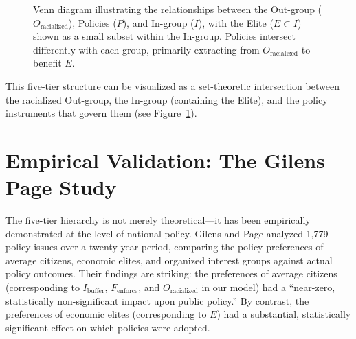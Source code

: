 \documentclass[12pt,openany]{book}
\begin{document}
\begin{figure}[htbp]
\centering
{}
\caption{Venn diagram illustrating the relationships between the Out-group ($O_{\text{racialized}}$), Policies ($P$), and In-group ($I$), with the Elite ($E \subset I$) shown as a small subset within the In-group. Policies intersect differently with each group, primarily extracting from $O_{\text{racialized}}$ to benefit $E$.}
\label{fig:venn_model}
\end{figure}

This five-tier structure can be visualized as a set-theoretic intersection between the racialized Out-group, the In-group (containing the Elite), and the policy instruments that govern them (see Figure~\ref{fig:venn_model}).

\section{Empirical Validation: The Gilens--Page Study}

The five-tier hierarchy is not merely theoretical---it has been empirically demonstrated at the level of national policy. Gilens and Page \cite{gilens} analyzed 1,779 policy issues over a twenty-year period, comparing the policy preferences of average citizens, economic elites, and organized interest groups against actual policy outcomes. Their findings are striking: the preferences of average citizens (corresponding to $I_{\text{buffer}}$, $F_{\text{enforce}}$, and $O_{\text{racialized}}$ in our model) had a ``near-zero, statistically non-significant impact upon public policy.'' By contrast, the preferences of economic elites (corresponding to $E$) had a substantial, statistically significant effect on which policies were adopted.
\end{document}
